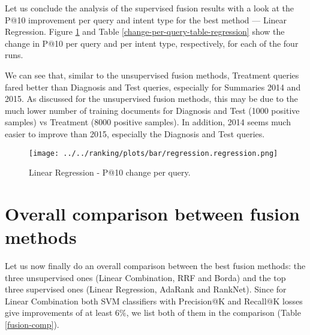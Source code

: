 Let us conclude the analysis of the supervised fusion results with a look at the P@10 improvement per query
and intent type
for the best method --- Linear Regression. Figure \ref{regression-query} and Table 
\ref{change-per-query-table-regression} show the change in P@10
per query and per intent type, respectively, for each of the four runs.

We can see that, similar to the unsupervised fusion methods,
Treatment queries fared better than Diagnosis and Test queries, especially for Summaries 2014 and 2015.
As discussed for the unsupervised fusion methods, this may be due to the much lower number of training
documents for Diagnosis and Test (1000 positive samples) vs Treatment (8000 positive samples).
In addition, 2014 seems much easier to improve than 2015, especially the Diagnosis and Test queries.

\begin{table}[h!]
\centering
\caption{Linear Regression - Change in P@10 per intent type.}
\label{change-per-query-table-regression}
\end{table}

\begin{figure}[h!]
\centerline{
  \texttt{[image: ../../ranking/plots/bar/regression.regression.png]}
  }
  \caption{Linear Regression - P@10 change per query.}
  \label{regression-query}
\end{figure}

\section{Overall comparison between fusion methods}
Let us now finally do an overall comparison between the best fusion methods: 
the three unsupervised ones (Linear Combination, RRF and Borda)
and the top three supervised ones (Linear Regression, AdaRank and RankNet).
Since for Linear Combination both SVM classifiers with Precision@K and Recall@K
losses give improvements of at least $6\%$, we list both of them in the comparison
(Table \ref{fusion-comp}).

